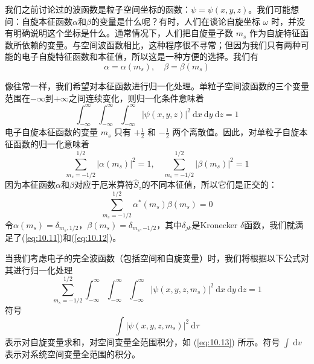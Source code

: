     我们之前讨论过的波函数是粒子空间坐标的函数：$\psi = \psi\left(x,y,z\right)$。我们可能想问：自旋本征函数$\alpha$和$\beta$的变量是什么呢？有时，人们在谈论自旋坐标 $\omega$ 时，并没有明确说明这个坐标是什么。通常情况下，人们把自旋量子数 $m_s$ 作为自旋特征函数所依赖的变量。与空间波函数相比，这种程序很不寻常；但因为我们只有两种可能的电子自旋特征函数和本征值，所以这是一种方便的选择。我们有
    \begin{equation}
        \alpha = \alpha\left(m_s\right), \quad
        \beta = \beta\left(m_s\right)
        \label{eq:10.10}
    \end{equation}

    像往常一样，我们希望对本征函数进行归一化处理。单粒子空间波函数的三个变量范围在$-\infty$到$+\infty$之间连续变化，则归一化条件意味着
    \begin{equation*}
        \int_{-\infty}^{\infty} \int_{-\infty}^{\infty} \int_{-\infty}^{\infty} \left|\psi\left(x, y, z\right)\right|^2\: \mathrm{d}x\: \mathrm{d}y\: \mathrm{d}z = 1
    \end{equation*}
    电子自旋本征函数的变量 $m_s$ 只有 $+\frac{1}{2}$ 和 $-\frac{1}{2}$ 两个离散值。因此，对单粒子自旋本征函数的归一化意味着
    \begin{equation}
        \sum_{m_{s}=-1/2}^{1/2} \left|\alpha \left(m_{s}\right)\right|^{2} = 1, \quad \sum_{m_{s}=-1/2}^{1/2} \left|\beta \left(m_{s}\right)\right|^{2} = 1
        \label{eq:10.11}
    \end{equation}
    因为本征函数$\alpha$和$\beta$对应于厄米算符$\hat{S}_z$的不同本征值，所以它们是正交的：
    \begin{equation}
        \sum_{m_{s}=-1/2}^{1/2} \alpha^ * \left(m_{s}\right) \beta \left(m_{s}\right) = 0
        \label{eq:10.12}
    \end{equation}
    令$\alpha\left(m_s\right) = \delta_{m_s, 1/2}$，$\beta\left(m_s\right) = \delta_{m_s, -1/2}$，其中$\delta_{jk}$是Kronecker $\delta$函数，我们就满足了(\ref{eq:10.11})和(\ref{eq:10.12})。

    当我们考虑电子的完全波函数（包括空间和自旋变量）时，我们将根据以下公式对其进行归一化处理
    \begin{equation}
        \boxed{
            \sum_{m_s=-1/2}^{1/2} \int_{-\infty}^{\infty} \int_{-\infty}^{\infty} \int_{-\infty}^{\infty} \left|\psi\left(x, y, z, m_s\right)\right|^2 \:\mathrm{d}x \:\mathrm{d}y \:\mathrm{d}z = 1
        }
        \label{eq:10.13}
    \end{equation}
    符号
    \begin{equation*}
        \int \left|\psi\left(x, y, z, m_s\right)\right|^2 \:\mathrm{d}\tau
    \end{equation*}
    表示对自旋变量求和，对空间变量全范围积分，如 (\ref{eq:10.13}) 所示。符号 $\int \:\mathrm{d}v$ 表示对系统空间变量全范围的积分。

